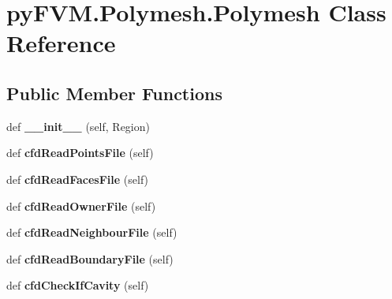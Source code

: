 \hypertarget{classpy_f_v_m_1_1_polymesh_1_1_polymesh}{}\section{py\+F\+V\+M.\+Polymesh.\+Polymesh Class Reference}
\label{classpy_f_v_m_1_1_polymesh_1_1_polymesh}
\subsection*{Public Member Functions}
\begin{DoxyCompactItemize}
\item 
\mbox{\label{classpy_f_v_m_1_1_polymesh_1_1_polymesh_aface21d80cf616a3d29e248eec9cee80}} 
def {\bfseries \+\_\+\+\_\+init\+\_\+\+\_\+} (self, Region)
\item 
\mbox{\label{classpy_f_v_m_1_1_polymesh_1_1_polymesh_a51eca6dee0ccbc8380084ed14538dff8}} 
def {\bfseries cfd\+Read\+Points\+File} (self)
\item 
\mbox{\label{classpy_f_v_m_1_1_polymesh_1_1_polymesh_a36ce77dd6a772aff836b2855e81e7558}} 
def {\bfseries cfd\+Read\+Faces\+File} (self)
\item 
\mbox{\label{classpy_f_v_m_1_1_polymesh_1_1_polymesh_a87f4696fadd4db651c262816c66df8a2}} 
def {\bfseries cfd\+Read\+Owner\+File} (self)
\item 
\mbox{\label{classpy_f_v_m_1_1_polymesh_1_1_polymesh_adb98d499389b14a17f3a3d6bc69043cb}} 
def {\bfseries cfd\+Read\+Neighbour\+File} (self)
\item 
\mbox{\label{classpy_f_v_m_1_1_polymesh_1_1_polymesh_a8be1370b391a13c32fd79ceba3e9c424}} 
def {\bfseries cfd\+Read\+Boundary\+File} (self)
\item 
\mbox{\label{classpy_f_v_m_1_1_polymesh_1_1_polymesh_aaf4def451e32b6b1b20b1ef576d47aa8}} 
def {\bfseries cfd\+Check\+If\+Cavity} (self)
\item 

\end{DoxyCompactItemize}
